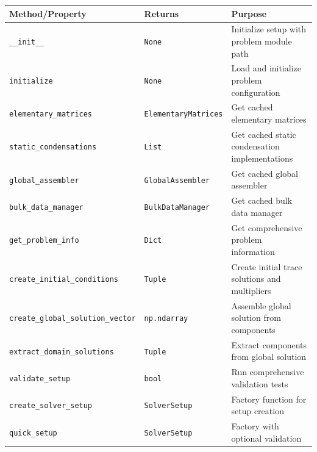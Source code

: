 \begin{longtable}{|p{6cm}|p{4cm}|p{4cm}|}
\hline
\textbf{Method/Property} & \textbf{Returns} & \textbf{Purpose} \\
\hline
\endhead

\texttt{\_\_init\_\_} & \texttt{None} & Initialize setup with problem module path \\
\hline

\texttt{initialize} & \texttt{None} & Load and initialize problem configuration \\
\hline

\texttt{elementary\_matrices} & \texttt{ElementaryMatrices} & Get cached elementary matrices \\
\hline

\texttt{static\_condensations} & \texttt{List} & Get cached static condensation implementations \\
\hline

\texttt{global\_assembler} & \texttt{GlobalAssembler} & Get cached global assembler \\
\hline

\texttt{bulk\_data\_manager} & \texttt{BulkDataManager} & Get cached bulk data manager \\
\hline

\texttt{get\_problem\_info} & \texttt{Dict} & Get comprehensive problem information \\
\hline

\texttt{create\_initial\_conditions} & \texttt{Tuple} & Create initial trace solutions and multipliers \\
\hline

\texttt{create\_global\_solution\_vector} & \texttt{np.ndarray} & Assemble global solution from components \\
\hline

\texttt{extract\_domain\_solutions} & \texttt{Tuple} & Extract components from global solution \\
\hline

\texttt{validate\_setup} & \texttt{bool} & Run comprehensive validation tests \\
\hline

\texttt{create\_solver\_setup} & \texttt{SolverSetup} & Factory function for setup creation \\
\hline

\texttt{quick\_setup} & \texttt{SolverSetup} & Factory with optional validation \\
\hline

\end{longtable}

